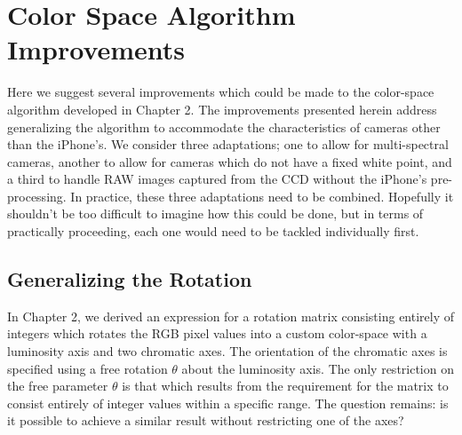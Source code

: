 
\section{Color Space Algorithm Improvements}\label{sec:ColorSpaceAlgorithmImprovements}
Here we suggest several improvements which could be made to the color-space algorithm developed in Chapter 2. The improvements presented herein address generalizing the algorithm to accommodate the characteristics of cameras other than the iPhone's. We consider three adaptations; one to allow for multi-spectral cameras, another to allow for cameras which do not have a fixed white point, and a third to handle RAW images captured from the CCD without the iPhone's pre-processing. In practice, these three adaptations need to be combined. Hopefully it shouldn't be too difficult to imagine how this could be done, but in terms of practically proceeding, each one would need to be tackled individually first.

\subsection{Generalizing the Rotation}\label{sec:GeneralizingTheRotation}
In Chapter 2, we derived an expression for a rotation matrix consisting entirely of integers which rotates the RGB pixel values into a custom color-space with a luminosity axis and two chromatic axes. The orientation of the chromatic axes is specified using a free rotation $\theta$ about the luminosity axis. The only restriction on the free parameter $\theta$ is that which results from the requirement for the matrix to consist entirely of integer values within a specific range. The question remains: is it possible to achieve a similar result without restricting one of the axes?

